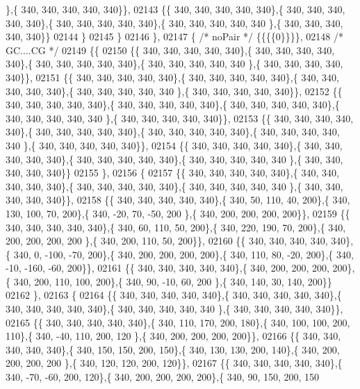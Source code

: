 \begin{DoxyCode}
      \},\{ 340, 340, 340, 340, 340\}\},
02143 \{\{ 340, 340, 340, 340, 340\},\{ 340, 340, 340, 340, 340\},\{ 340, 340, 340, 340, 340\},\{ 340, 340, 340, 340, 340
      \},\{ 340, 340, 340, 340, 340\}\}
02144 \}
02145 \}
02146 \},
02147 \{ \textcolor{comment}{/* noPair */} \{\{\{\{0\}\}\}\},
02148 \textcolor{comment}{/* GC....CG */}
02149 \{\{
02150 \{\{ 340, 340, 340, 340, 340\},\{ 340, 340, 340, 340, 340\},\{ 340, 340, 340, 340, 340\},\{ 340, 340, 340, 340, 340
      \},\{ 340, 340, 340, 340, 340\}\},
02151 \{\{ 340, 340, 340, 340, 340\},\{ 340, 340, 340, 340, 340\},\{ 340, 340, 340, 340, 340\},\{ 340, 340, 340, 340, 340
      \},\{ 340, 340, 340, 340, 340\}\},
02152 \{\{ 340, 340, 340, 340, 340\},\{ 340, 340, 340, 340, 340\},\{ 340, 340, 340, 340, 340\},\{ 340, 340, 340, 340, 340
      \},\{ 340, 340, 340, 340, 340\}\},
02153 \{\{ 340, 340, 340, 340, 340\},\{ 340, 340, 340, 340, 340\},\{ 340, 340, 340, 340, 340\},\{ 340, 340, 340, 340, 340
      \},\{ 340, 340, 340, 340, 340\}\},
02154 \{\{ 340, 340, 340, 340, 340\},\{ 340, 340, 340, 340, 340\},\{ 340, 340, 340, 340, 340\},\{ 340, 340, 340, 340, 340
      \},\{ 340, 340, 340, 340, 340\}\}
02155 \},
02156 \{
02157 \{\{ 340, 340, 340, 340, 340\},\{ 340, 340, 340, 340, 340\},\{ 340, 340, 340, 340, 340\},\{ 340, 340, 340, 340, 340
      \},\{ 340, 340, 340, 340, 340\}\},
02158 \{\{ 340, 340, 340, 340, 340\},\{ 340,  50, 110,  40, 200\},\{ 340, 130, 100,  70, 200\},\{ 340, -20,  70, -50, 200
      \},\{ 340, 200, 200, 200, 200\}\},
02159 \{\{ 340, 340, 340, 340, 340\},\{ 340,  60, 110,  50, 200\},\{ 340, 220, 190,  70, 200\},\{ 340, 200, 200, 200, 200
      \},\{ 340, 200, 110,  50, 200\}\},
02160 \{\{ 340, 340, 340, 340, 340\},\{ 340,   0, -100, -70, 200\},\{ 340, 200, 200, 200, 200\},\{ 340, 110,  80, -20, 
      200\},\{ 340, -10, -160, -60, 200\}\},
02161 \{\{ 340, 340, 340, 340, 340\},\{ 340, 200, 200, 200, 200\},\{ 340, 200, 110, 100, 200\},\{ 340,  90, -10,  60, 200
      \},\{ 340, 140,  30, 140, 200\}\}
02162 \},
02163 \{
02164 \{\{ 340, 340, 340, 340, 340\},\{ 340, 340, 340, 340, 340\},\{ 340, 340, 340, 340, 340\},\{ 340, 340, 340, 340, 340
      \},\{ 340, 340, 340, 340, 340\}\},
02165 \{\{ 340, 340, 340, 340, 340\},\{ 340, 110, 170, 200, 180\},\{ 340, 100, 100, 200, 110\},\{ 340, -40, 110, 200, 120
      \},\{ 340, 200, 200, 200, 200\}\},
02166 \{\{ 340, 340, 340, 340, 340\},\{ 340, 150, 150, 200, 150\},\{ 340, 130, 130, 200, 140\},\{ 340, 200, 200, 200, 200
      \},\{ 340, 120, 120, 200, 120\}\},
02167 \{\{ 340, 340, 340, 340, 340\},\{ 340, -70, -60, 200, 120\},\{ 340, 200, 200, 200, 200\},\{ 340,  90, 150, 200, 150

\end{DoxyCode}
